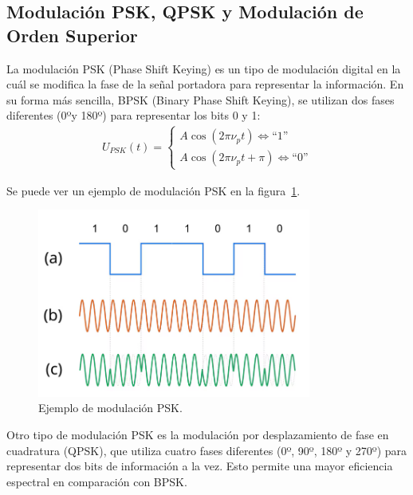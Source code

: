 \documentclass[12pt, letterpaper]{article}
\begin{document}
\subsection{Modulación PSK, QPSK y Modulación de Orden Superior}
La modulación PSK (Phase Shift Keying) es un tipo de modulación digital en la cuál se modifica la fase de la señal portadora para representar la información. En su forma más sencilla, BPSK (Binary Phase Shift Keying), se utilizan dos fases diferentes (0ºy 180º) para representar los bits 0 y 1:
\begin{align}
    U_{PSK}(t) =
    \left\{
    \begin{array}{l}
        A \cos(2\pi\nu_p t) \Leftrightarrow \text{``1''} \\
        A \cos(2\pi\nu_p t + \pi) \Leftrightarrow \text{``0''}
    \end{array}
    \right.
\end{align}

Se puede ver un ejemplo de modulación PSK en la figura~\ref{fig:psk}.
\begin{figure}[h]
    \centering
    \includegraphics[width=9cm]{images/PSK.png}
    \caption{Ejemplo de modulación PSK.\label{fig:psk}}
\end{figure}

Otro tipo de modulación PSK es la modulación por desplazamiento de fase en cuadratura (QPSK), que utiliza cuatro fases diferentes (0º, 90º, 180º y 270º) para representar dos bits de información a la vez. Esto permite una mayor eficiencia espectral en comparación con BPSK.\@
\end{document}
